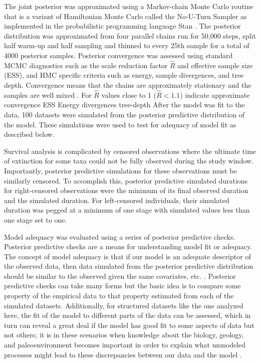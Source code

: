 \documentclass[11pt]{article}
\begin{document}
The joint posterior was approximated using a Markov-chain Monte Carlo routine that is a variant of Hamiltonian Monte Carlo called the No-U-Turn Sampler \citep{Hoffman2014} as implemented in the probabilistic programming language Stan \citep{2014stan}. 
The posterior distribution was approximated from four parallel chains run for 50,000 steps, split half warm-up and half sampling and thinned to every 25th sample for a total of 4000 posterior samples. 
Posterior convergence was assessed using standard MCMC diagnostics such as the scale reduction factor \(\hat{R}\) and effective sample size (ESS), and HMC specific criteria such as energy, sample divergences, and tree depth.
Convergence means that the chains are approximately stationary and the samples are well mixed \citep{Gelman2013d}. 
For \(\hat{R}\) values close to 1 (\(\hat{R} < 1.1\)) indicate approximate convergence 
ESS
Energy
divergences
tree-depth
After the model was fit to the data, 100 datasets were simulated from the posterior predictive distribution of the model. These simulations were used to test for adequacy of model fit as described below.

Survival analysis is complicated by censored observations where the ultimate time of extinction for some taxa could not be fully observed during the study window. Importantly, posterior predictive simulations for these observations must be similarly censored. To accomplish this, posterior predictive simulated durations for right-censored observations were the minimum of its final observed duration and the simulated duration. For left-censored individuals, their simulated duration was pegged at a minimum of one stage with simulated values less than one stage set to one.

Model adequacy was evaluated using a series of posterior predictive checks. Posterior predictive checks are a means for understanding model fit or adequacy. The concept of model adequacy is that if our model is an adequate descriptor of the observed data, then data simulated from the posterior predictive distribution should be similar to the observed given the same covariates, etc. \citep{Gelman2013d}. Posterior predictive checks can take many forms but the basic idea is to compare some property of the empirical data to that property estimated from each of the simulated datasets. Additionally, for structured datasets like the one analyzed here, the fit of the model to different parts of the data can be assessed, which in turn can reveal a great deal if the model has good fit to some aspects of data but not others; it is in these scenarios when knowledge about the biology, geology, and paleoenvironment becomes important in order to explain what unmodeled processes might lead to these discrepancies between our data and the model \citep{Gelman2013d}.
\end{document}
